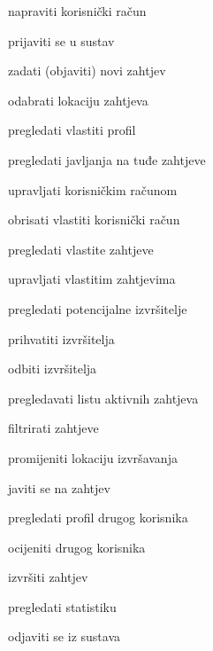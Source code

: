 			
			\begin{packed_enum}
				\item  {}
				
				\begin{packed_enum}
					
					\item napraviti korisnički račun

					
					
				\end{packed_enum}
				
				\item  {}
				
				\begin{packed_enum}
					\item prijaviti se u sustav
					\item zadati (objaviti) novi zahtjev
					\begin{packed_enum}
						\item odabrati lokaciju zahtjeva
						
					\end{packed_enum}
					\item pregledati vlastiti profil
					\begin{packed_enum}
						\item pregledati javljanja na tuđe zahtjeve
						\item upravljati korisničkim računom
						\item obrisati vlastiti korisnički račun
					\end{packed_enum}
					\item pregledati vlastite zahtjeve
					\begin{packed_enum}
						\item upravljati vlastitim zahtjevima
						\item pregledati potencijalne izvršitelje
						\begin{packed_enum}
							\item prihvatiti izvršitelja
							\item odbiti izvršitelja	
						\end{packed_enum}
					\end{packed_enum}
					\item pregledavati listu aktivnih zahtjeva
					\begin{packed_enum}
						\item filtrirati zahtjeve
						\item promijeniti lokaciju izvršavanja
						\item javiti se na zahtjev	
					\end{packed_enum}
					\item pregledati profil drugog korisnika
					\item  ocijeniti drugog korisnika
					\item izvršiti zahtjev
					\item pregledati statistiku
					\item odjaviti se iz sustava
					

\end{packed_enum}
\end{packed_enum}
